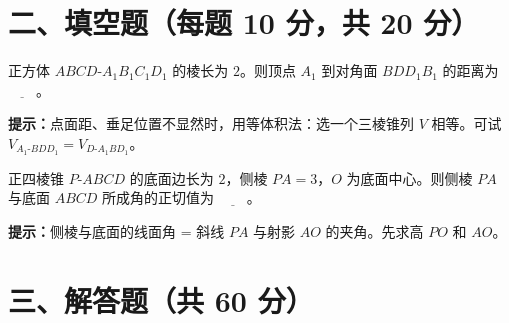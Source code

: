 \documentclass{exam-zh}
\begin{document}
\section*{二、填空题（每题 10 分，共 20 分）}


\begin{question}[points=10]
  \noindent
  \begin{minipage}[t]{\dimexpr\linewidth-70mm-6mm\relax}
    \vspace{0pt}
    正方体 $ABCD\text{-}A_1B_1C_1D_1$ 的棱长为 $2$。则顶点 $A_1$ 到对角面 $BDD_1B_1$ 的距离为 $\underline{\hspace{2em}}$。
    \begin{hintbox}
\textbf{提示：}点面距、垂足位置不显然时，用等体积法：选一个三棱锥列 $V$ 相等。可试 $V_{A_1\text{-}BDD_1}=V_{D\text{-}A_1BD_1}$。\end{hintbox}

  \end{minipage}\hfill
  \begin{diagramcoltikz}{70mm}{正方体，标出 $A_1$ 与对角面 $BDD_1B_1$。}
  }
  \end{diagramcoltikz}
\end{question}




\begin{question}[points=10]
  \noindent
  \begin{minipage}[t]{\dimexpr\linewidth-70mm-6mm\relax}
    \vspace{0pt}
    正四棱锥 $P\text{-}ABCD$ 的底面边长为 $2$，侧棱 $PA=3$，$O$ 为底面中心。则侧棱 $PA$ 与底面 $ABCD$ 所成角的正切值为 $\underline{\hspace{2em}}$。
    \begin{hintbox}
\textbf{提示：}侧棱与底面的线面角 = 斜线 $PA$ 与射影 $AO$ 的夹角。先求高 $PO$ 和 $AO$。\end{hintbox}

  \end{minipage}\hfill
  \begin{diagramcoltikz}{70mm}{正四棱锥，标出侧棱 $PA$、底面中心 $O$ 与高 $PO$。}
  }
  \end{diagramcoltikz}
\end{question}



\section*{三、解答题（共 60 分）}
\end{document}
